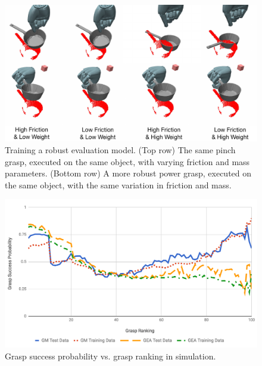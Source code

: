 \begin{figure}[t]
\includegraphics[width=\columnwidth]{images/frictionweight}
\caption{Training a robust evaluation model. (Top row) The same pinch grasp, executed on the same object, with varying friction and mass parameters. (Bottom row) A more robust power grasp, executed on the same object, with the same variation in friction and mass. \label{fig:evaluative-training}}
\end{figure}

\begin{figure}[hb]
  \includegraphics[width=\linewidth]{images/successvsranking.png}
  \caption{Grasp success probability vs. grasp ranking in simulation.}
  \label{fig:successvsranking}
\end{figure}

